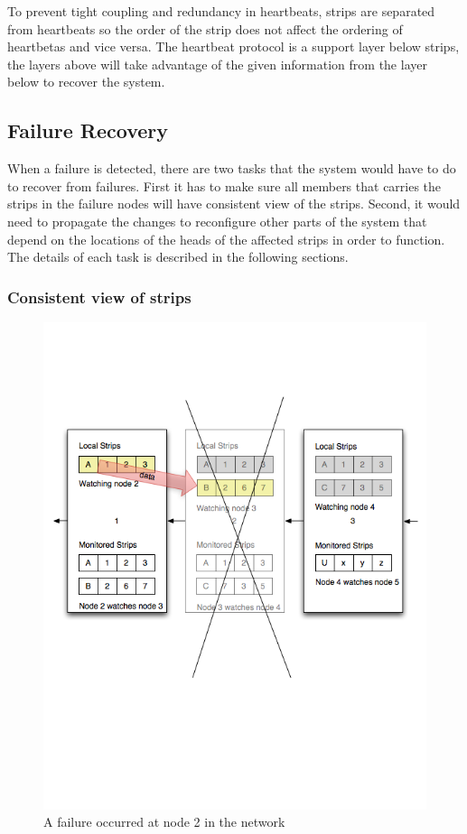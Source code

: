 To prevent tight coupling and redundancy in heartbeats, strips are separated
from heartbeats so the order of the strip does not affect the ordering of
heartbetas and vice versa. The heartbeat protocol is a support layer below
strips, the layers above will take advantage of the given information from the
layer below to recover the system.

\subsection{Failure Recovery}
\label{s:fr}

When a failure is detected, there are two tasks that the system would have to do
to recover from failures. First it has to make sure all members that carries
the strips in the failure nodes will have consistent view of the strips.
Second, it would need to propagate the changes to reconfigure other parts of
the system that depend on the locations of the heads of the affected strips in
order to function. The details of each task is described in the following
sections.

\subsubsection{Consistent view of strips}

\begin{figure}[h!]
\centering
    \includegraphics[width=\linewidth]{figures/strip3}
\caption{A failure occurred at node 2 in the network}
\label{fig:strip3}
\end{figure}

